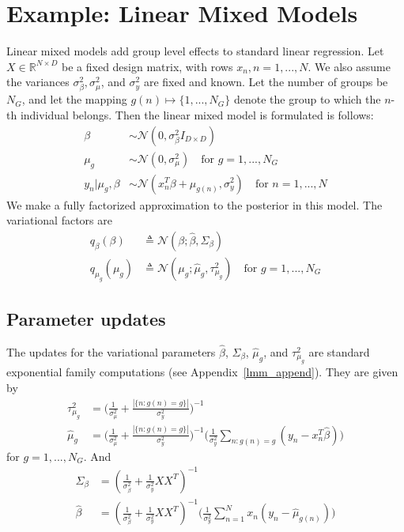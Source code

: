 \documentclass{article}
\begin{document}
\section{Example: Linear Mixed Models} 
Linear mixed models add group level effects to standard linear regression. Let $X\in \mathbb{R}^{N\times D}$ be a fixed design matrix, with rows $x_n, n = 1,..., N$. We also assume the variances $\sigma^2_\beta, \sigma^2_\mu$, and $\sigma^2_y$ are fixed and known. Let the number of groups be $N_G$, and let the mapping $g(n)\mapsto \{1, ..., N_G\}$ denote the group to which the $n$-th individual belongs. Then the linear mixed model is formulated is follows: 
\begin{align}
\beta &\sim \mathcal N(0, \sigma^2_\beta I_{D\times D}) \label{eq:lmm_prior1}\\
\mu_g &\sim \mathcal N(0, \sigma^2_\mu) \quad \text{for $g= 1, ..., N_G$} \label{eq:lmm_prior2}\\
y_n | \mu_g, \beta &\sim \mathcal N (x_n^T\beta + \mu_{g(n)}, \sigma^2_y)\quad \text{for $n = 1, ..., N$}\label{eq:lmm_LH}
\end{align}
We make a fully factorized approximation to the posterior in this model. The variational factors are
\begin{align}
q_\beta(\beta) &\triangleq \mathcal N (\beta; \hat \beta, \Sigma_\beta)\\
q_{\mu_g}(\mu_g) &\triangleq \mathcal{N}(\mu_g; \hat\mu_g, \tau^2_{\mu_g}) \quad \text{for }g = 1, ..., N_G
\end{align}

\subsection{Parameter updates}
The updates for the variational parameters $\hat\beta$, $\Sigma_\beta$, $\hat\mu_g$, and $\tau^2_{\mu_g}$ are standard exponential family computations (see Appendix~\ref{lmm_append}). They are given by 
\begin{align}
{\tau^2_{\mu_g}} &= \Big(\frac{1}{\sigma^2_\mu} + \frac{|\{n : g(n) = g\}|}{\sigma^2_y}\Big)^{-1}\\
{\hat\mu_g} &= \Big(\frac{1}{\sigma^2_\mu} + \frac{|\{n : g(n) = g\}|}{\sigma^2_y}\Big)^{-1}\Big(\frac{1}{\sigma^2_y}\sum_{n: g(n) = g} (y_n - x_n^T\hat\beta)\Big) \label{eq:lmm_mu_upd}
\end{align}
for $g = 1, ..., N_G$. And 
\begin{align}
\Sigma_\beta &= (\frac{1}{\sigma^2_\beta} + \frac{1}{\sigma^2_y}XX^T)^{-1}\\
\hat\beta &= (\frac{1}{\sigma^2_\beta} + \frac{1}{\sigma^2_y}XX^T)^{-1}\Big(\frac{1}{\sigma^2_y}\sum_{n=1}^N  x_n(y_n - \hat\mu_{g(n)} )\Big)
\end{align}
\end{document}
